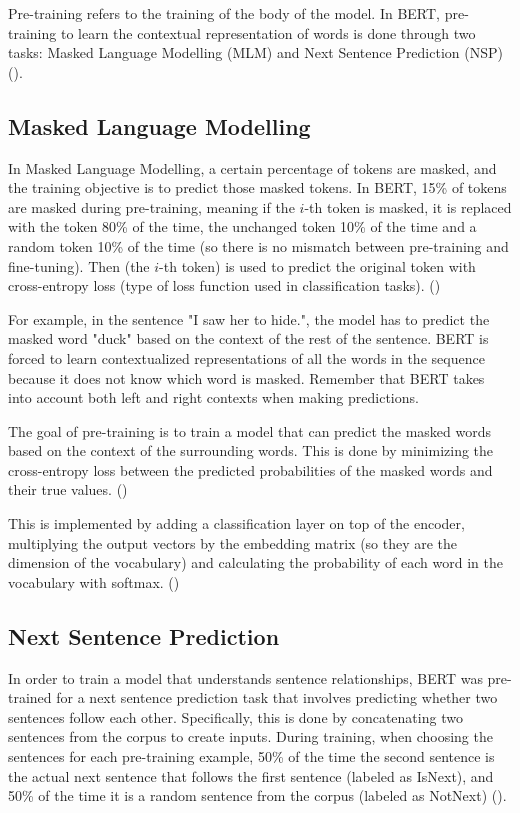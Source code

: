 Pre-training refers to the training of the body of the model.
In BERT, pre-training to learn the contextual representation of words is done through two tasks: Masked Language Modelling (MLM) and Next Sentence Prediction (NSP) (\cite{devlin_bert_2019}).

\subsection{Masked Language Modelling}

In Masked Language Modelling, a certain percentage of tokens are masked, and the training objective is to predict those masked tokens. In BERT, 15\% of tokens are masked during pre-training, meaning if the $i$-th token is masked, it is replaced with the {\selectfont [MASK]} token 80\% of the time, the unchanged token 10\% of the time and a random token 10\% of the time (so there is no mismatch between pre-training and fine-tuning). Then {\selectfont [MASK]} (the $i$-th token) is used to predict the original token with cross-entropy loss (type of loss function used in classification tasks). (\cite{devlin_bert_2019})

For example, in the sentence "I saw her {\selectfont [MASK]} to hide.", the model has to predict the masked word "duck" based on the context of the rest of the sentence. BERT is forced to learn contextualized representations of all the words in the sequence because it does not know which word is masked. Remember that BERT takes into account both left and right contexts when making predictions.

The goal of pre-training is to train a model that can predict the masked words based on the context of the surrounding words. This is done by minimizing the cross-entropy loss between the predicted probabilities of the masked words and their true values. (\cite{devlin_bert_2019})

This is implemented by adding a classification layer on top of the encoder, multiplying the output vectors by the embedding matrix (so they are the dimension of the vocabulary) and calculating the probability of each word in the vocabulary with softmax. (\cite{devlin_bert_2019})

\subsection{Next Sentence Prediction}

In order to train a model that understands sentence relationships, BERT was pre-trained for a next sentence prediction task that involves predicting whether two sentences follow each other. Specifically, this is done by concatenating two sentences from the corpus to create inputs. During training, when choosing the sentences for each pre-training example, 50\% of the time the second sentence is the actual next sentence that follows the first sentence (labeled as {\selectfont IsNext}), and 50\% of the time it is a random sentence from the corpus (labeled as {\selectfont NotNext}) (\cite{devlin_bert_2019}).

